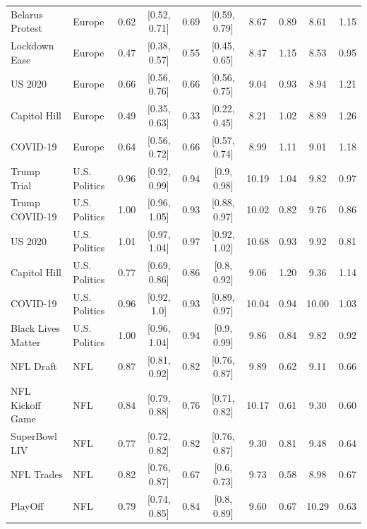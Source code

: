 \documentclass[fleqn,10pt]{wlscirep}
\begin{document}
\begin{table}[ht]
{\begin{tabular}{|l|l|c|c|c|c|c|c|c|c|}
Belarus Protest & Europe & 0.62 & [0.52, 0.71] & 0.69 & [0.59, 0.79] & 8.67 & 0.89 & 8.61 & 1.15 \\
Lockdown Ease & Europe & 0.47 & [0.38, 0.57] & 0.55 & [0.45, 0.65] & 8.47 & 1.15 & 8.53 & 0.95 \\
US 2020 & Europe & 0.66 & [0.56, 0.76] & 0.66 & [0.56, 0.75] & 9.04 & 0.93 & 8.94 & 1.21 \\
Capitol Hill & Europe & 0.49 & [0.35, 0.63] & 0.33 & [0.22, 0.45] & 8.21 & 1.02 & 8.89 & 1.26 \\
COVID-19 & Europe & 0.64 & [0.56, 0.72] & 0.66 & [0.57, 0.74] & 8.99 & 1.11 & 9.01 & 1.18 \\
Trump Trial & U.S. Politics & 0.96 & [0.92, 0.99] & 0.94 & [0.9, 0.98] & 10.19 & 1.04 & 9.82 & 0.97 \\
Trump COVID-19 & U.S. Politics & 1.00 & [0.96, 1.05] & 0.93 & [0.88, 0.97] & 10.02 & 0.82 & 9.76 & 0.86 \\
US 2020 & U.S. Politics & 1.01 & [0.97, 1.04] & 0.97 & [0.92, 1.02] & 10.68 & 0.93 & 9.92 & 0.81 \\
Capitol Hill & U.S. Politics & 0.77 & [0.69, 0.86] & 0.86 & [0.8, 0.92] & 9.06 & 1.20 & 9.36 & 1.14 \\
COVID-19 & U.S. Politics & 0.96 & [0.92, 1.0] & 0.93 & [0.89, 0.97] & 10.04 & 0.94 & 10.00 & 1.03 \\
Black Lives Matter & U.S. Politics & 1.00 & [0.96, 1.04] & 0.94 & [0.9, 0.99] & 9.86 & 0.84 & 9.82 & 0.92 \\
NFL Draft & NFL & 0.87 & [0.81, 0.92] & 0.82 & [0.76, 0.87] & 9.89 & 0.62 & 9.11 & 0.66 \\
NFL Kickoff Game & NFL & 0.84 & [0.79, 0.88] & 0.76 & [0.71, 0.82] & 10.17 & 0.61 & 9.30 & 0.60 \\
SuperBowl LIV & NFL & 0.77 & [0.72, 0.82] & 0.82 & [0.76, 0.87] & 9.30 & 0.81 & 9.48 & 0.64 \\
NFL Trades & NFL & 0.82 & [0.76, 0.87] & 0.67 & [0.6, 0.73] & 9.73 & 0.58 & 8.98 & 0.67 \\
PlayOff & NFL & 0.79 & [0.74, 0.85] & 0.84 & [0.8, 0.89] & 9.60 & 0.67 & 10.29 & 0.63 \\
\hline
\end{tabular}
}
\end{table}

\pagebreak[2]
\clearpage
\end{document}
